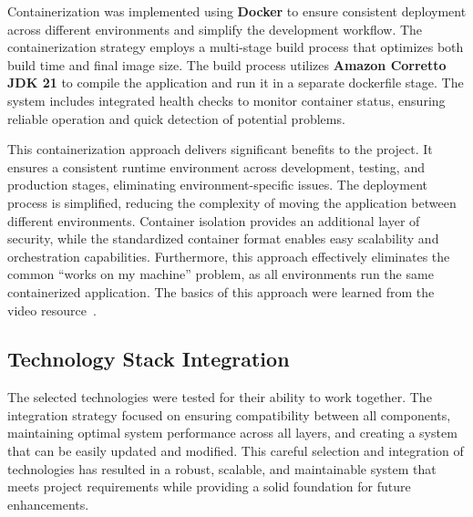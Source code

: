 Containerization was implemented using \textbf{Docker} to ensure consistent deployment across different environments and simplify the development workflow.
The containerization strategy employs a multi-stage build process that optimizes both build time and final image size.
The build process utilizes \textbf{Amazon Corretto JDK 21} to compile the application and run it in a separate dockerfile stage.
The system includes integrated health checks to monitor container status, ensuring reliable operation and quick detection of potential problems.

This containerization approach delivers significant benefits to the project.
It ensures a consistent runtime environment across development, testing, and production stages, eliminating environment-specific issues.
The deployment process is simplified, reducing the complexity of moving the application between different environments.
Container isolation provides an additional layer of security, while the standardized container format enables easy scalability and orchestration capabilities.
Furthermore, this approach effectively eliminates the common ``works on my machine'' problem, as all environments run the same containerized application.
The basics of this approach were learned from the video resource~\cite{LearnDocker}.

\subsection{Technology Stack Integration}\label{subsec:integration}

The selected technologies were tested for their ability to work together.
The integration strategy focused on ensuring compatibility between all components, maintaining optimal system performance across all layers, and creating a system that can be easily updated and modified.
This careful selection and integration of technologies has resulted in a robust, scalable, and maintainable system that meets project requirements while providing a solid foundation for future enhancements.

